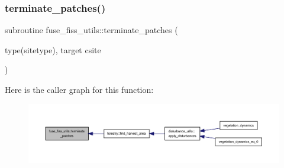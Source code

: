\subsubsection{\texorpdfstring{terminate\+\_\+patches()}{terminate\_patches()}}
{\footnotesize\ttfamily subroutine fuse\+\_\+fiss\+\_\+utils\+::terminate\+\_\+patches (\begin{DoxyParamCaption}\item[{type(sitetype), target}]{csite }\end{DoxyParamCaption})}

Here is the caller graph for this function\+:
\nopagebreak
\begin{figure}[H]
\begin{center}
\leavevmode
\includegraphics[width=350pt]{namespacefuse__fiss__utils_a480df748f946b24daa940c15d72abfe2_icgraph}
\end{center}
\end{figure}
